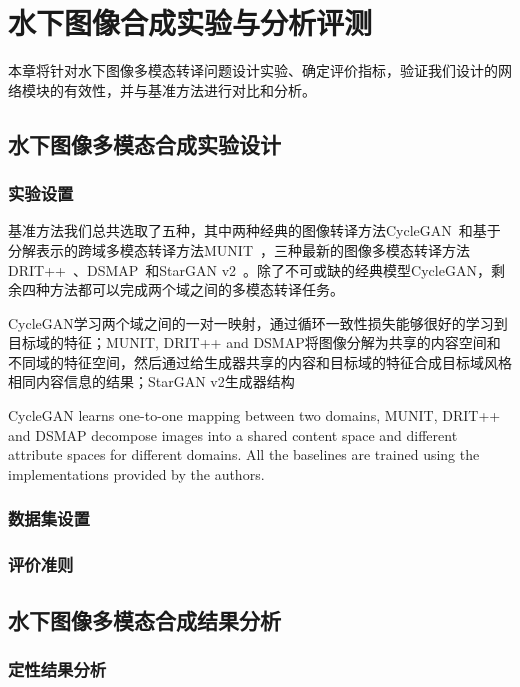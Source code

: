 \chapter{水下图像合成实验与分析评测}
本章将针对水下图像多模态转译问题设计实验、确定评价指标，验证我们设计的网络模块的有效性，并与基准方法进行对比和分析。

\section{水下图像多模态合成实验设计}
\subsection{实验设置}
基准方法我们总共选取了五种，其中两种经典的图像转译方法CycleGAN~\citep{zhu2017unpaired}和基于分解表示的跨域多模态转译方法MUNIT~\citep{huang2018multimodal}，三种最新的图像多模态转译方法DRIT++~\citep{lee2020drit++}、DSMAP~\citep{chang2020domain}和StarGAN v2~\cite{choi2020stargan}。除了不可或缺的经典模型CycleGAN，剩余四种方法都可以完成两个域之间的多模态转译任务。

CycleGAN学习两个域之间的一对一映射，通过循环一致性损失能够很好的学习到目标域的特征；MUNIT, DRIT++ and DSMAP将图像分解为共享的内容空间和不同域的特征空间，然后通过给生成器共享的内容和目标域的特征合成目标域风格相同内容信息的结果；StarGAN v2生成器结构

CycleGAN learns one-to-one mapping between two domains, MUNIT, DRIT++ and DSMAP decompose images into a shared content space and different attribute spaces for different domains. All the baselines are trained using the implementations provided by the authors. 

\subsection{数据集设置}

\subsection{评价准则}

\section{水下图像多模态合成结果分析}
\subsection{定性结果分析}

